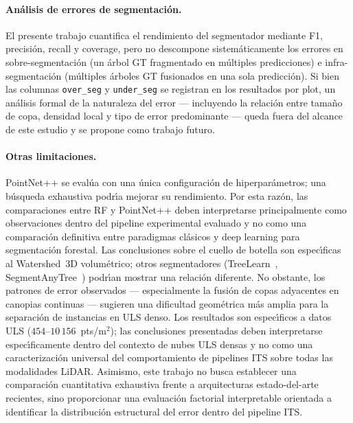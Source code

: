\documentclass[runningheads]{llncs}
\begin{document}
\paragraph{An\'alisis de errores de segmentaci\'on.}
El presente trabajo cuantifica el rendimiento del segmentador mediante F1, precisi\'on, recall y coverage, pero no descompone sistem\'aticamente los errores en sobre-segmentaci\'on (un \'arbol GT fragmentado en m\'ultiples predicciones) e infra-segmentaci\'on (m\'ultiples \'arboles GT fusionados en una sola predicci\'on). Si bien las columnas \texttt{over\_seg} y \texttt{under\_seg} se registran en los resultados por plot, un an\'alisis formal de la naturaleza del error --- incluyendo la relaci\'on entre tama\~no de copa, densidad local y tipo de error predominante --- queda fuera del alcance de este estudio y se propone como trabajo futuro.

\paragraph{Otras limitaciones.}
PointNet++ se eval\'ua con una \'unica configuraci\'on de hiperpar\'ametros; una b\'usqueda exhaustiva podr\'\i{}a mejorar su rendimiento. Por esta raz\'on, las comparaciones entre RF y PointNet++ deben interpretarse principalmente como observaciones dentro del pipeline experimental evaluado y no como una comparaci\'on definitiva entre paradigmas cl\'asicos y deep learning para segmentaci\'on forestal. Las conclusiones sobre el cuello de botella son espec\'\i{}ficas al Watershed~3D volum\'etrico; otros segmentadores (TreeLearn~\cite{henrich2024}, SegmentAnyTree~\cite{wielgosz2024}) podr\'\i{}an mostrar una relaci\'on diferente. No obstante, los patrones de error observados --- especialmente la fusi\'on de copas adyacentes en canopias continuas --- sugieren una dificultad geom\'etrica m\'as amplia para la separaci\'on de instancias en ULS denso. Los resultados son espec\'\i{}ficos a datos ULS ($454$--$10\,156$~pts/m$^2$); las conclusiones presentadas deben interpretarse espec\'\i{}ficamente dentro del contexto de nubes ULS densas y no como una caracterizaci\'on universal del comportamiento de pipelines ITS sobre todas las modalidades LiDAR. Asimismo, este trabajo no busca establecer una comparaci\'on cuantitativa exhaustiva frente a arquitecturas estado-del-arte recientes, sino proporcionar una evaluaci\'on factorial interpretable orientada a identificar la distribuci\'on estructural del error dentro del pipeline ITS.

\end{document}
